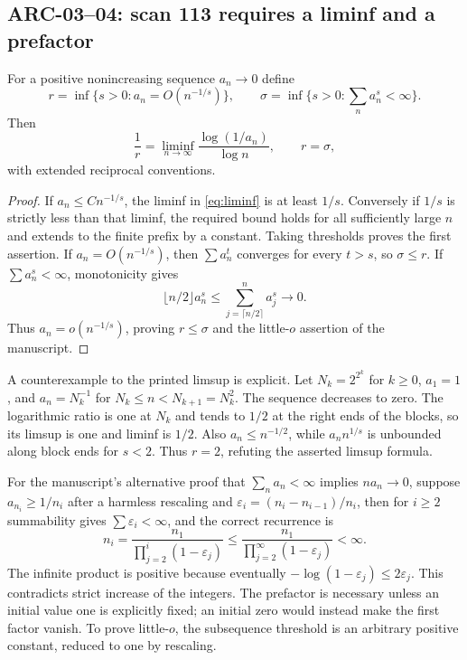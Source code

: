 \documentclass[11pt,a4paper]{article}
\begin{document}
\subsection{ARC-03--04: scan 113 requires a liminf and a prefactor}
For a positive nonincreasing sequence $a_n\to0$ define
\[
 r=\inf\{s>0:a_n=O(n^{-1/s})\},\qquad
 \sigma=\inf\{s>0:\sum_na_n^s<\infty\}.
\]
Then
\begin{equation}\label{eq:liminf}
 \frac1r=\liminf_{n\to\infty}\frac{\log(1/a_n)}{\log n},\qquad r=\sigma,
\end{equation}
with extended reciprocal conventions.
\begin{proof}
If $a_n\le Cn^{-1/s}$, the liminf in \eqref{eq:liminf} is at least $1/s$. Conversely if $1/s$ is strictly less than that liminf, the required bound holds for all sufficiently large $n$ and extends to the finite prefix by a constant. Taking thresholds proves the first assertion. If $a_n=O(n^{-1/s})$, then $\sum a_n^t$ converges for every $t>s$, so $\sigma\le r$. If $\sum a_n^s<\infty$, monotonicity gives
\[
 \lfloor n/2\rfloor a_n^s\le\sum_{j=\lceil n/2\rceil}^n a_j^s\longrightarrow0.
\]
Thus $a_n=o(n^{-1/s})$, proving $r\le\sigma$ and the little-$o$ assertion of the manuscript.
\end{proof}
A counterexample to the printed limsup is explicit. Let $N_k=2^{2^k}$ for $k\ge0$, $a_1=1$, and $a_n=N_k^{-1}$ for $N_k\le n<N_{k+1}=N_k^2$. The sequence decreases to zero. The logarithmic ratio is one at $N_k$ and tends to $1/2$ at the right ends of the blocks, so its limsup is one and liminf is $1/2$. Also $a_n\le n^{-1/2}$, while $a_nn^{1/s}$ is unbounded along block ends for $s<2$. Thus $r=2$, refuting the asserted limsup formula.

For the manuscript's alternative proof that $\sum_n a_n<\infty$ implies $na_n\to0$, suppose $a_{n_i}\ge1/n_i$ after a harmless rescaling and $\varepsilon_i=(n_i-n_{i-1})/n_i$, then for $i\ge2$ summability gives $\sum\varepsilon_i<\infty$, and the correct recurrence is
\[
 n_i=\frac{n_1}{\prod_{j=2}^i(1-\varepsilon_j)}
 \le\frac{n_1}{\prod_{j=2}^\infty(1-\varepsilon_j)}<\infty.
\]
The infinite product is positive because eventually $-\log(1-\varepsilon_j)\le2\varepsilon_j$. This contradicts strict increase of the integers. The prefactor is necessary unless an initial value one is explicitly fixed; an initial zero would instead make the first factor vanish. To prove little-$o$, the subsequence threshold is an arbitrary positive constant, reduced to one by rescaling.
\end{document}
